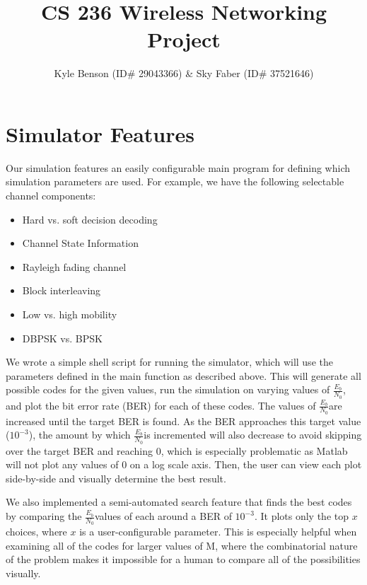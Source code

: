 \documentclass[a4paper,10pt]{article}
\title{CS 236 Wireless Networking Project}
\author{Kyle Benson (ID\# 29043366) \& Sky Faber (ID\# 37521646)}
\begin{document}
\maketitle

\newcommand{\ebno}{$\frac{E_b}{N_0}$}
\newcommand{\ber}{$10^{-3}$}
\newcommand{\circuit}[1]{

\texttt{[image: \#1]}}
\newcommand{\graph}[1]{

\vspace{-1.4in}

  \texttt{[image: \#1]}
\vspace{-1.4in}
}

\section{Simulator Features}

Our simulation features an easily configurable main program for defining which simulation parameters are used.
For example, we have the following selectable channel components:

\begin{itemize}
 \item Hard vs. soft decision decoding
 \item Channel State Information
  \item Rayleigh fading channel
  \item Block interleaving
  \item Low vs. high mobility
  \item DBPSK vs. BPSK
\end{itemize}

We wrote a simple shell script for running the simulator, which will use the parameters defined in the main function as described above.
This will generate all possible codes for the given values, run the simulation on varying values of \ebno, and plot the bit error rate (BER) for each of these codes.
The values of \ebno are increased until the target BER is found.
As the BER approaches this target value (\ber), the amount by which \ebno is incremented will also decrease to avoid skipping over the target BER and reaching 0, which is especially problematic as Matlab will not plot any values of 0 on a log scale axis.
Then, the user can view each plot side-by-side and visually determine the best result.

We also implemented a semi-automated search feature that finds the best codes by comparing the \ebno values of each around a BER of \ber.
It plots only the top $x$ choices, where $x$ is a user-configurable parameter.
This is especially helpful when examining all of the codes for larger values of M, where the combinatorial nature of the problem makes it impossible for a human to compare all of the possibilities visually.
\end{document}
